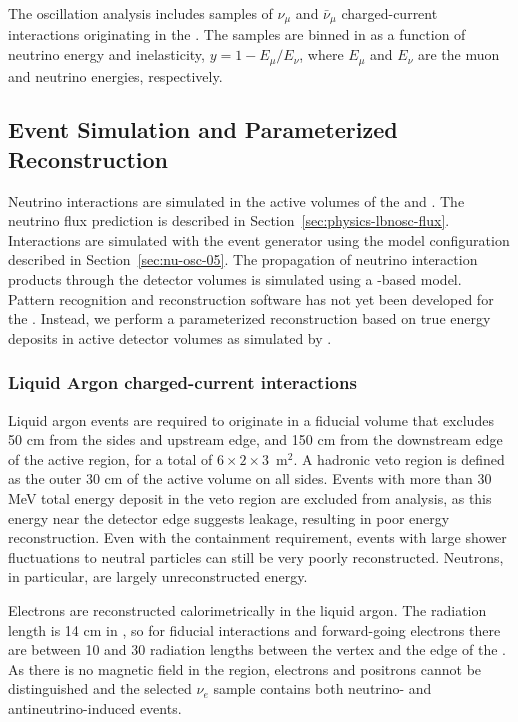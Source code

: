 The oscillation analysis includes samples of $\nu_{\mu}$ and $\bar{\nu}_{\mu}$ charged-current interactions originating in the . The samples are binned in \twod as a function of neutrino energy and inelasticity, $y = 1 - E_{\mu}/E_{\nu}$, where $E_{\mu}$ and $E_{\nu}$ are the muon and neutrino energies, respectively. 

\subsection{Event Simulation and Parameterized Reconstruction}
\label{sec:ndsimreco}

Neutrino interactions are simulated in the active volumes of the  and  . The neutrino flux prediction is described in Section~\ref{sec:physics-lbnosc-flux}. Interactions are simulated with the  event generator using the model configuration described in Section~\ref{sec:nu-osc-05}. The propagation of neutrino interaction products through the detector volumes is simulated using a -based model. Pattern recognition and reconstruction software has not yet been developed for the . Instead, we perform a parameterized reconstruction based on true energy deposits in active detector volumes as simulated by .

\subsubsection{Liquid Argon charged-current interactions}

Liquid argon events are required to originate in a fiducial volume that excludes 50 cm from the sides and upstream edge, and 150 cm from the downstream edge of the active region, for a total of $6 \times 2 \times 3$~m$^{2}$. A hadronic veto region is defined as the outer 30 cm of the active volume on all sides. Events with more than 30 MeV total energy deposit in the veto region are excluded from analysis, as this energy near the detector edge suggests leakage, resulting in poor energy reconstruction. Even with the containment requirement, events with large shower fluctuations to neutral particles can still be very poorly reconstructed. Neutrons, in particular, are largely unreconstructed energy.

Electrons are reconstructed calorimetrically in the liquid argon. The radiation length is 14 cm in , so for fiducial interactions and forward-going electrons there are between 10 and 30 radiation lengths between the vertex and the edge of the . As there is no magnetic field in the   region, electrons and positrons cannot be distinguished and the selected $\nu_{e}$ sample contains both neutrino- and antineutrino-induced events.

